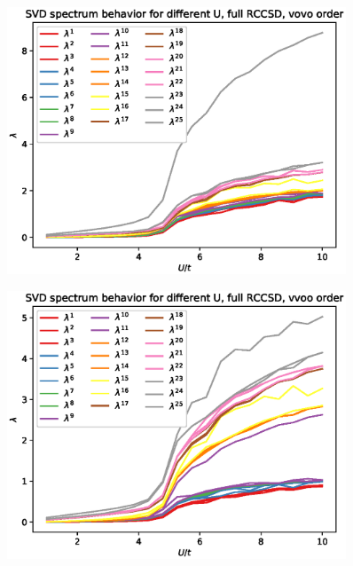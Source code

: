 \documentclass[a4paper,10pt]{article}
\begin{document}
\begin{figure}[!htb]
\centering
\includegraphics[width=0.9\textwidth]{figures/lam1_lamN_vs_u_10_sites_rccsd_vovo.eps}
\end{figure}

\begin{figure}[!htb]
\centering
\includegraphics[width=0.9\textwidth]{figures/lam1_lamN_vs_u_10_sites_rccsd_vvoo.eps}
\end{figure}
\end{document}
